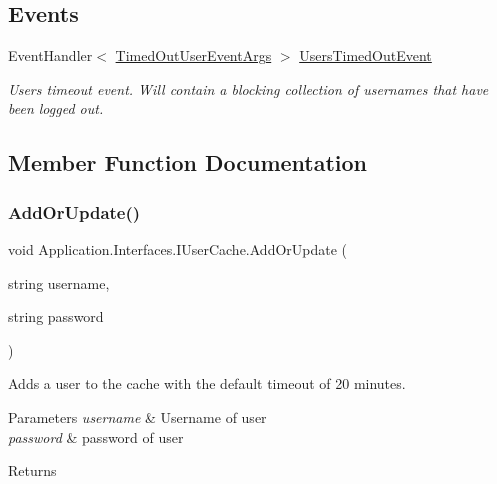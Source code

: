 \subsection*{Events}
\begin{DoxyCompactItemize}
\item 
Event\+Handler$<$ \mbox{\hyperlink{class_application_1_1_interfaces_1_1_timed_out_user_event_args}{Timed\+Out\+User\+Event\+Args}} $>$ \mbox{\hyperlink{interface_application_1_1_interfaces_1_1_i_user_cache_ae30035d1893d41c53cdd16627963a252}{Users\+Timed\+Out\+Event}}
\begin{DoxyCompactList}\small\item\em Users timeout event. Will contain a blocking collection of usernames that have been logged out. \end{DoxyCompactList}\end{DoxyCompactItemize}


\subsection{Member Function Documentation}
\mbox{\label{interface_application_1_1_interfaces_1_1_i_user_cache_a607deb5ebf1cfb0f237daf9981206d73}} 
\subsubsection{\texorpdfstring{Add\+Or\+Update()}{AddOrUpdate()}\hspace{0.1cm}{\footnotesize\ttfamily [1/2]}}
{\footnotesize\ttfamily void Application.\+Interfaces.\+I\+User\+Cache.\+Add\+Or\+Update (\begin{DoxyParamCaption}\item[{string}]{username,  }\item[{string}]{password }\end{DoxyParamCaption})}



Adds a user to the cache with the default timeout of 20 minutes. 


\begin{DoxyParams}{Parameters}
{\em username} & Username of user\\
\hline
{\em password} & password of user\\
\hline
\end{DoxyParams}
\begin{DoxyReturn}{Returns}

\end{DoxyReturn}


